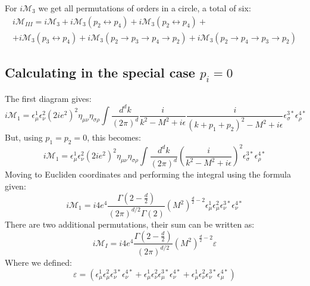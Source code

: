 \documentclass{article}
\begin{document}
 For $i\mathcal{M}_3$ we get all permutations of orders in a circle, a total of six:
\begin{equation}
\begin{gathered}
    i\mathcal{M}_{III} = i\mathcal{M}_3
    + i\mathcal{M}_3(p_2 \leftrightarrow p_4)
    + i\mathcal{M}_3(p_2 \leftrightarrow p_4)
    + \\
    + i\mathcal{M}_3(p_3 \leftrightarrow p_4)
    + i\mathcal{M}_3(p_2 \rightarrow p_3 \rightarrow p_4 \rightarrow p_2)
    + i\mathcal{M}_3(p_2 \rightarrow p_4 \rightarrow p_3 \rightarrow p_2)
\end{gathered}
\end{equation}
\subsection{Calculating in the special case $p_i = 0$}
The first diagram gives:
\begin{equation}
    i\mathcal{M}_1 = \epsilon^1_\mu\epsilon^2_\nu (2ie^2)^2\eta_{\mu\nu}\eta_{\sigma\rho} \int \frac{d^dk}{(2\pi)^d} \frac{i}{k^2 - M^2 + i\epsilon}\frac{i}{(k + p_1 + p_2)^2 - M^2 + i\epsilon} \epsilon^{3*}_\sigma\epsilon^{4*}_\rho
\end{equation}
But, using $p_1 = p_2 = 0$, this becomes:
\begin{equation}
    i\mathcal{M}_1 = \epsilon^1_\mu\epsilon^2_\nu (2ie^2)^2\eta_{\mu\nu}\eta_{\sigma\rho} \int \frac{d^dk}{(2\pi)^d} \left(\frac{i}{k^2 - M^2 + i\epsilon}\right)^2 \epsilon^{3*}_\sigma\epsilon^{4*}_\rho
\end{equation}
Moving to Eucliden coordinates and performing the integral using the formula given:
\begin{equation}
    i\mathcal{M}_1 = i4e^4 \frac{\Gamma\left(2 - \frac{d}{2}\right)}{(2\pi)^{d/2}\Gamma(2)}(M^2)^{\frac{d}{2} - 2}\epsilon^1_\mu\epsilon^2_\mu\epsilon^{3*}_\nu\epsilon^{4*}_\nu
\end{equation}
There are two additional permutations, their sum can be written as:
\begin{equation}
    i\mathcal{M}_{I} = i4e^4 \frac{\Gamma\left(2 - \frac{d}{2}\right)}{(2\pi)^{d/2}}(M^2)^{\frac{d}{2} - 2} \varepsilon
\end{equation}
Where we defined:
\begin{equation}
    \varepsilon = \left(
        \epsilon^1_\mu\epsilon^2_\mu\epsilon^{3*}_\nu\epsilon^{4*}_\nu +
        \epsilon^1_\mu\epsilon^2_\nu\epsilon^{3*}_\mu\epsilon^{4*}_\nu +
        \epsilon^1_\mu\epsilon^2_\nu\epsilon^{3*}_\nu\epsilon^{4*}_\mu
    \right)
\end{equation}
\end{document}
